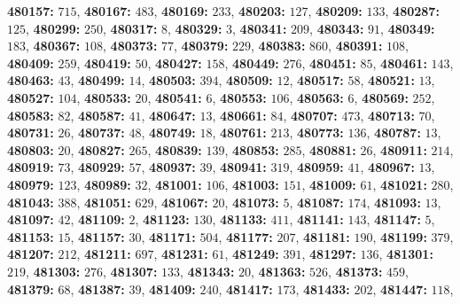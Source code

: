 \textsf{\bfseries 480157:} $715$, \textsf{\bfseries 480167:} $483$, \textsf{\bfseries 480169:} $233$, \textsf{\bfseries 480203:} $127$, \textsf{\bfseries 480209:} $133$, \textsf{\bfseries 480287:} $125$, \textsf{\bfseries 480299:} $250$, \textsf{\bfseries 480317:} $8$, \textsf{\bfseries 480329:} $3$, \textsf{\bfseries 480341:} $209$, \textsf{\bfseries 480343:} $91$, \textsf{\bfseries 480349:} $183$, \textsf{\bfseries 480367:} $108$, \textsf{\bfseries 480373:} $77$, \textsf{\bfseries 480379:} $229$, \textsf{\bfseries 480383:} $860$, \textsf{\bfseries 480391:} $108$, \textsf{\bfseries 480409:} $259$, \textsf{\bfseries 480419:} $50$, \textsf{\bfseries 480427:} $158$, \textsf{\bfseries 480449:} $276$, \textsf{\bfseries 480451:} $85$, \textsf{\bfseries 480461:} $143$, \textsf{\bfseries 480463:} $43$, \textsf{\bfseries 480499:} $14$, \textsf{\bfseries 480503:} $394$, \textsf{\bfseries 480509:} $12$, \textsf{\bfseries 480517:} $58$, \textsf{\bfseries 480521:} $13$, \textsf{\bfseries 480527:} $104$, \textsf{\bfseries 480533:} $20$, \textsf{\bfseries 480541:} $6$, \textsf{\bfseries 480553:} $106$, \textsf{\bfseries 480563:} $6$, \textsf{\bfseries 480569:} $252$, \textsf{\bfseries 480583:} $82$, \textsf{\bfseries 480587:} $41$, \textsf{\bfseries 480647:} $13$, \textsf{\bfseries 480661:} $84$, \textsf{\bfseries 480707:} $473$, \textsf{\bfseries 480713:} $70$, \textsf{\bfseries 480731:} $26$, \textsf{\bfseries 480737:} $48$, \textsf{\bfseries 480749:} $18$, \textsf{\bfseries 480761:} $213$, \textsf{\bfseries 480773:} $136$, \textsf{\bfseries 480787:} $13$, \textsf{\bfseries 480803:} $20$, \textsf{\bfseries 480827:} $265$, \textsf{\bfseries 480839:} $139$, \textsf{\bfseries 480853:} $285$, \textsf{\bfseries 480881:} $26$, \textsf{\bfseries 480911:} $214$, \textsf{\bfseries 480919:} $73$, \textsf{\bfseries 480929:} $57$, \textsf{\bfseries 480937:} $39$, \textsf{\bfseries 480941:} $319$, \textsf{\bfseries 480959:} $41$, \textsf{\bfseries 480967:} $13$, \textsf{\bfseries 480979:} $123$, \textsf{\bfseries 480989:} $32$, \textsf{\bfseries 481001:} $106$, \textsf{\bfseries 481003:} $151$, \textsf{\bfseries 481009:} $61$, \textsf{\bfseries 481021:} $280$, \textsf{\bfseries 481043:} $388$, \textsf{\bfseries 481051:} $629$, \textsf{\bfseries 481067:} $20$, \textsf{\bfseries 481073:} $5$, \textsf{\bfseries 481087:} $174$, \textsf{\bfseries 481093:} $13$, \textsf{\bfseries 481097:} $42$, \textsf{\bfseries 481109:} $2$, \textsf{\bfseries 481123:} $130$, \textsf{\bfseries 481133:} $411$, \textsf{\bfseries 481141:} $143$, \textsf{\bfseries 481147:} $5$, \textsf{\bfseries 481153:} $15$, \textsf{\bfseries 481157:} $30$, \textsf{\bfseries 481171:} $504$, \textsf{\bfseries 481177:} $207$, \textsf{\bfseries 481181:} $190$, \textsf{\bfseries 481199:} $379$, \textsf{\bfseries 481207:} $212$, \textsf{\bfseries 481211:} $697$, \textsf{\bfseries 481231:} $61$, \textsf{\bfseries 481249:} $391$, \textsf{\bfseries 481297:} $136$, \textsf{\bfseries 481301:} $219$, \textsf{\bfseries 481303:} $276$, \textsf{\bfseries 481307:} $133$, \textsf{\bfseries 481343:} $20$, \textsf{\bfseries 481363:} $526$, \textsf{\bfseries 481373:} $459$, \textsf{\bfseries 481379:} $68$, \textsf{\bfseries 481387:} $39$, \textsf{\bfseries 481409:} $240$, \textsf{\bfseries 481417:} $173$, \textsf{\bfseries 481433:} $202$, \textsf{\bfseries 481447:} $118$, 
